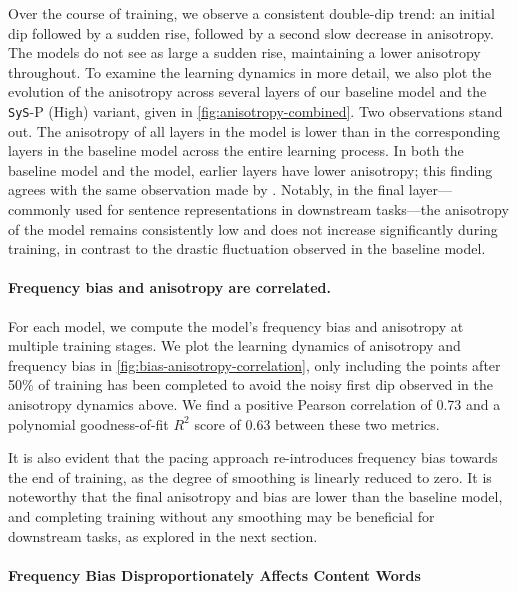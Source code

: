Over the course of training, we observe a consistent double-dip trend: an initial dip followed by a sudden rise, followed by a second slow decrease in anisotropy. The \smoothing models do not see as large a sudden rise, maintaining a lower anisotropy throughout. To examine the learning dynamics in more detail, we also plot the evolution of the anisotropy across several layers of our baseline model and the \texttt{SyS}-P (High) variant, given in \cref{fig:anisotropy-combined}. Two observations stand out. The anisotropy of all layers in the \smoothing model is lower than in the corresponding layers in the baseline model across the entire learning process. In both the baseline model and the \smoothing model, earlier layers have lower anisotropy; this finding agrees with the same observation made by \citeauthor{ethayarajh2019contextual}. Notably, in the final layer—commonly used for sentence representations in downstream tasks—the anisotropy of the \smoothing model remains consistently low and does not increase significantly during training, in contrast to the drastic fluctuation observed in the baseline model. 



\paragraph{Frequency bias and anisotropy are correlated.}

For each model, we compute the model's frequency bias and anisotropy at multiple training stages. We plot the learning dynamics of anisotropy and frequency bias in \cref{fig:bias-anisotropy-correlation}, only including the points after 50\% of training has been completed to avoid the noisy first dip observed in the anisotropy dynamics above. We find a positive Pearson correlation of 0.73 and a polynomial goodness-of-fit $R^2$ score of 0.63 between these two metrics.

It is also evident that the pacing approach re-introduces frequency bias towards the end of training, as the degree of smoothing is linearly reduced to zero. It is noteworthy that the final anisotropy and bias are lower than the baseline model, and completing training without any smoothing may be beneficial for downstream tasks, as explored in the next section.

\paragraph{Frequency Bias Disproportionately Affects Content Words}
\label{section:word-class-versus-word-frequency}


